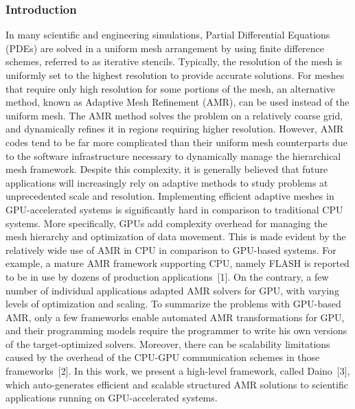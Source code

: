 \documentclass{book}
\begin{document}
\subsubsection{Introduction}
In many scientific and engineering simulations, Partial Differential Equations (PDEs) are solved in a uniform mesh arrangement by using finite difference schemes, referred to as iterative stencils. Typically, the resolution of the mesh is uniformly set to the highest resolution to provide accurate solutions. For meshes that require only high resolution for some portions of the mesh, an alternative method, known as Adaptive Mesh Refinement (AMR), can be used instead of the uniform mesh. The AMR method solves the problem on a relatively coarse grid, and dynamically refines it in regions requiring higher resolution. However, AMR codes tend to be far more complicated than their uniform mesh counterparts due to the software infrastructure necessary to dynamically manage the hierarchical mesh framework. Despite this complexity, it is generally believed that future applications will increasingly rely on adaptive methods to study problems at unprecedented scale and resolution.
Implementing efficient adaptive meshes in GPU-accelerated systems is significantly hard in comparison to traditional CPU systems. More specifically, GPUs add complexity overhead for managing the mesh hierarchy and optimization of data movement. This is made evident by the relatively wide use of AMR in CPU in comparison to GPU-based systems. For example, a mature AMR framework supporting CPU, namely FLASH is reported to be in use by dozens of production applications~[1]. On the contrary, a few number of individual applications adapted AMR solvers for GPU, with varying levels of optimization and scaling. To summarize the problems with GPU-based AMR, only a few frameworks enable automated AMR transformations for GPU, and their programming models require the programmer to write his own versions of the target-optimized solvers. Moreover, there can be scalability limitations caused by the overhead of the CPU-GPU communication schemes in those frameworks~[2].
In this work, we present a high-level framework, called Daino~[3], which auto-generates efficient and scalable structured AMR solutions to scientific applications running on GPU-accelerated systems.
\end{document}
